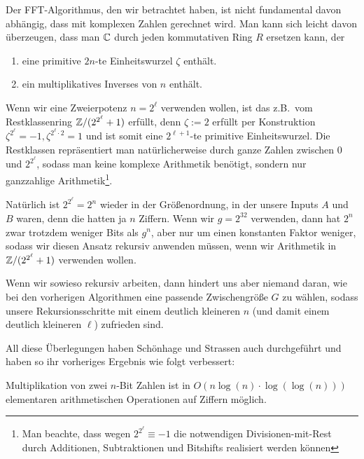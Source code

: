 \begin{remark}
    Der FFT-Algorithmus, den wir betrachtet haben, ist nicht fundamental davon abhängig, dass mit komplexen Zahlen gerechnet wird. Man kann sich leicht davon überzeugen, dass man $\mathbb{C}$ durch jeden kommutativen Ring $R$ ersetzen kann, der
    \begin{enumerate}
        \item eine primitive $2n$-te Einheitswurzel $\zeta$ enthält.
        \item ein multiplikatives Inverses von $n$ enthält.
    \end{enumerate}

    Wenn wir eine Zweierpotenz $n=2^\ell$ verwenden wollen, ist das z.B.\ vom Restklassenring $\mathbb{Z}/(2^{2^\ell}+1)$ erfüllt, denn $\zeta:=2$ erfüllt per Konstruktion $\zeta^{2^\ell} = -1, \zeta^{2^\ell \cdot 2}=1$ und ist somit eine $2^{\ell+1}$-te primitive Einheitswurzel. Die Restklassen repräsentiert man natürlicherweise durch ganze Zahlen zwischen $0$ und $2^{2^\ell}$, sodass man keine komplexe Arithmetik benötigt, sondern nur ganzzahlige Arithmetik\footnote{Man beachte, dass wegen $2^{2^\ell} \equiv -1$ die notwendigen Divisionen-mit-Rest durch Additionen, Subtraktionen und Bitshifts realisiert werden können}.

    \smallskip
    Natürlich ist $2^{2^\ell}=2^n$ wieder in der Größenordnung, in der unsere Inputs $A$ und $B$ waren, denn die hatten ja $n$ Ziffern. Wenn wir $g=2^{32}$ verwenden, dann hat $2^n$ zwar trotzdem weniger Bits als $g^n$, aber nur um einen konstanten Faktor weniger, sodass wir diesen Ansatz rekursiv anwenden müssen, wenn wir Arithmetik in $\mathbb{Z}/(2^{2^\ell}+1)$ verwenden wollen.

    Wenn wir sowieso rekursiv arbeiten, dann hindert uns aber niemand daran, wie bei den vorherigen Algorithmen eine passende Zwischengröße $G$ zu wählen, sodass unsere Rekursionsschritte mit einem deutlich kleineren $n$ (und damit einem deutlich kleineren $\ell$) zufrieden sind.

    \medskip
    All diese Überlegungen haben Schönhage und Strassen auch durchgeführt und haben so ihr vorheriges Ergebnis wie folgt verbessert:
\end{remark}

\begin{theorem}
    Multiplikation von zwei $n$-Bit Zahlen ist in $O(n\log(n)\cdot\log(\log(n)))$ elementaren arithmetischen Operationen auf Ziffern möglich.
\end{theorem}

